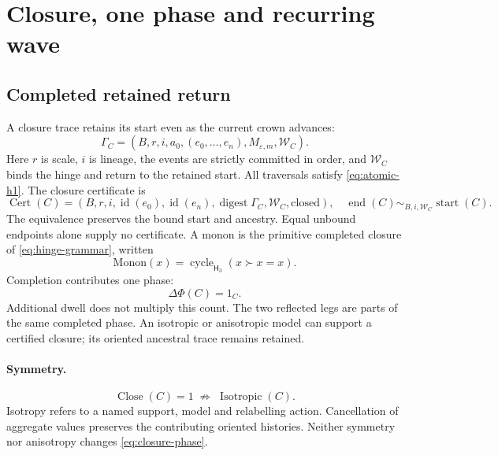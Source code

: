 \section{Closure, one phase and recurring wave}
\label{sec:closure-phase-wave}

\subsection{Completed retained return}
\label{subsec:monon-beat}
\label{subsec:monon-cycle}
\label{app:wave}
\label{app:wave:scope}
A closure trace retains its start even as the current crown advances:
\begin{equation}
\Gamma_C=(B,r,i,a_0,(e_0,\ldots,e_n),M_{\varepsilon,m},\mathcal W_C).
\label{eq:closure-trace}
\end{equation}
Here \(r\) is scale, \(i\) is lineage, the events are strictly committed in
order, and \(\mathcal W_C\) binds the hinge and return to the retained start.
All traversals satisfy \eqref{eq:atomic-h1}. The closure certificate is
\begin{equation}
\operatorname{Cert}(C)=
(B,r,i,\operatorname{id}(e_0),\operatorname{id}(e_n),
\operatorname{digest}\Gamma_C,\mathcal W_C,\mathrm{closed}),
\quad \operatorname{end}(C)\sim_{B,i,\mathcal W_C}\operatorname{start}(C).
\label{eq:closure-certificate}
\end{equation}
The equivalence preserves the bound start and ancestry. Equal unbound
endpoints alone supply no certificate. A monon is the primitive completed
closure of \eqref{eq:hinge-grammar}, written
\begin{equation}
\mathrm{Monon}(x)=\operatorname{cycle}_{\mathsf H_3}(x\succ x=x).
\label{eq:monon-cycle}
\end{equation}
Completion contributes one phase:
\begin{equation}
\Delta\Phi(C)=1_C.
\label{eq:closure-phase}
\end{equation}
Additional dwell does not multiply this count. The two reflected legs are
parts of the same completed phase. An isotropic or anisotropic model can
support a certified closure; its oriented ancestral trace remains retained.

\paragraph{Symmetry.}
\begin{equation}
\operatorname{Close}(C)=1\;\not\Rightarrow\;\operatorname{Isotropic}(C).
\label{eq:closure-not-isotropy}
\end{equation}
Isotropy refers to a named support, model and relabelling action. Cancellation
of aggregate values preserves the contributing oriented histories. Neither
symmetry nor anisotropy changes \eqref{eq:closure-phase}.


